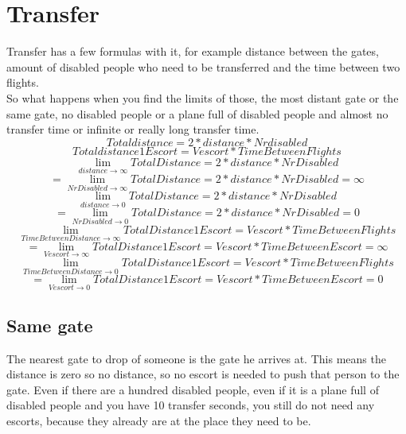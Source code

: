\documentclass[a4paper, 11pt, notitlepage]{report}
\begin{document}
\section{Transfer}
Transfer has a few formulas with it, for example distance between the gates, amount of disabled people who need to be transferred and the time between two flights. \\
So what happens when you find the limits of those, the most distant gate or the same gate, no disabled people or a plane full of disabled people and almost no transfer time or infinite or really long transfer time.\\
\begin{equation}
Totaldistance = 2 * distance *Nrdisabled
\end{equation}
\begin{equation}
Totaldistance1Escort= Vescort * TimeBetweenFlights
\end{equation}
\begin{equation}
\lim_{distance \rightarrow \infty} TotalDistance = 2 * distance * NrDisabled
\end{equation}
\begin{equation}
 = \lim_{NrDisabled \rightarrow \infty} TotalDistance = 2 * distance * NrDisabled = \infty
\end{equation}
\begin{equation}
\lim_{distance \rightarrow 0} TotalDistance = 2 * distance * NrDisabled
\end{equation}
\begin{equation}
= \lim_{NrDisabled \rightarrow 0} TotalDistance = 2 * distance * NrDisabled = 0
\end{equation}
\begin{equation}
\lim_{TimeBetweenDistance \rightarrow \infty} TotalDistance1Escort = Vescort*TimeBetweenFlights
\end{equation}
\begin{equation}
= \lim_{Vescort \rightarrow \infty} TotalDistance1Escort = Vescort*TimeBetweenEscort = \infty
\end{equation}
\begin{equation}
\lim_{TimeBetweenDistance \rightarrow 0} TotalDistance1Escort = Vescort*TimeBetweenFlights
\end{equation}
\begin{equation}
= \lim_{Vescort \rightarrow 0} TotalDistance1Escort = Vescort*TimeBetweenEscort = 0
\end{equation}

\subsection{Same gate}
The nearest gate to drop of someone is the gate he arrives at. This means the distance is zero so no distance, so no escort is needed to push that person to the gate. Even if there are a hundred disabled people, even if it is a plane full of disabled people and you have 10 transfer seconds, you still do not need any escorts, because they already are at the place they need to be.
\end{document}
